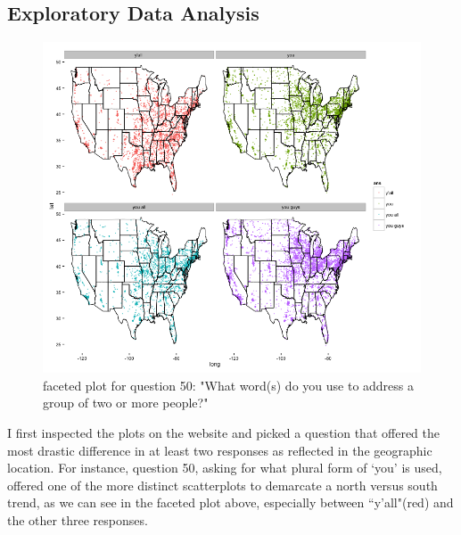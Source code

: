 \documentclass{article}\usepackage[]{graphicx}\usepackage[]{color}
\begin{document}
\subsection{Exploratory Data Analysis}
\begin{figure}[H]
\centering
\includegraphics[width=400pts, height=250pts]{you_facet.png}
\caption{faceted plot for question 50: "What word(s) do you use to address a group of two or more people?"}

\end{figure}

I first inspected the plots on the website and picked a question that offered the most drastic difference in at least two responses as reflected in the geographic location. For instance, question 50, asking for what plural form of  `you' is used, offered one of the more distinct scatterplots to demarcate a north versus south trend, as we can see in the faceted plot above, especially between ``y'all"(red)  and the other three responses.  
\end{document}
